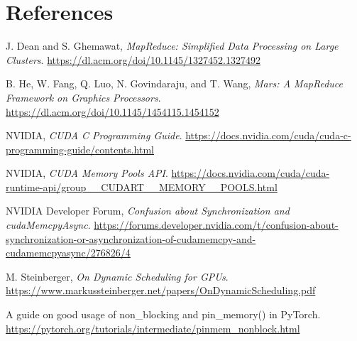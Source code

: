 \documentclass{article}
\begin{document}
\section{References}
\begin{thebibliography}
\raggedright

J. Dean and S. Ghemawat, \textit{MapReduce: Simplified Data Processing on Large Clusters}. \href{https://dl.acm.org/doi/10.1145/1327452.1327492}{https://dl.acm.org/doi/10.1145/1327452.1327492}

B. He, W. Fang, Q. Luo, N. Govindaraju, and T. Wang, \textit{Mars: A MapReduce Framework on Graphics Processors}. \href{https://dl.acm.org/doi/10.1145/1454115.1454152}{https://dl.acm.org/doi/10.1145/1454115.1454152}

NVIDIA, \textit{CUDA C Programming Guide}. \href{https://docs.nvidia.com/cuda/cuda-c-programming-guide/contents.html}{https://docs.nvidia.com/cuda/cuda-c-programming-guide/contents.html}

NVIDIA, \textit{CUDA Memory Pools API}. \href{https://docs.nvidia.com/cuda/cuda-runtime-api/group__CUDART__MEMORY__POOLS.html}{https://docs.nvidia.com/cuda/cuda-runtime-api/group\_\_CUDART\_\_MEMORY\_\_POOLS.html}

NVIDIA Developer Forum, \textit{Confusion about Synchronization and cudaMemcpyAsync}. \href{https://forums.developer.nvidia.com/t/confusion-about-synchronization-or-asynchronization-of-cudamemcpy-and-cudamemcpyasync/276826/4}{https://forums.developer.nvidia.com/t/confusion-about-synchronization-or-asynchronization-of-cudamemcpy-and-cudamemcpyasync/276826/4}

M. Steinberger, \textit{On Dynamic Scheduling for GPUs}. \href{https://www.markussteinberger.net/papers/OnDynamicScheduling.pdf}{https://www.markussteinberger.net/papers/OnDynamicScheduling.pdf}

A guide on good usage of non\_blocking and pin\_memory() in PyTorch. \href{https://pytorch.org/tutorials/intermediate/pinmem_nonblock.html}{https://pytorch.org/tutorials/intermediate/pinmem\_nonblock.html}


\end{thebibliography}
\end{document}
